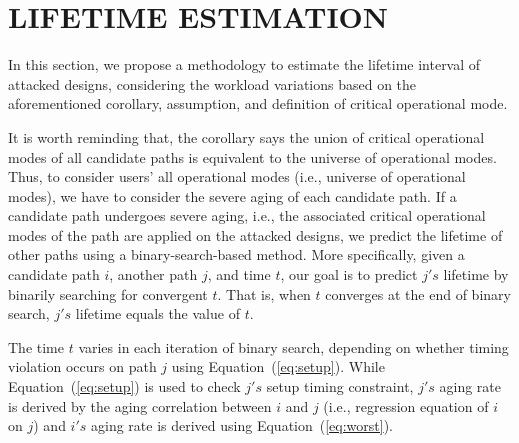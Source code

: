 
\section{LIFETIME ESTIMATION}
\label{sec:lt_estimation}
In this section, we propose a methodology to estimate the lifetime interval of attacked designs, considering the workload variations based on the aforementioned corollary, assumption, and definition of critical operational mode.

It is worth reminding that, the corollary says the union of critical operational modes of all candidate paths is equivalent to the universe of operational modes. Thus, to consider users' all operational modes (i.e., universe of operational modes), we have to consider the severe aging of each candidate path. If a candidate path undergoes severe aging, i.e., the associated critical operational modes of the path are applied on the attacked designs, we predict the lifetime of other paths using a binary-search-based method. More specifically, given a candidate path $i$, another path $j$, and time $t$, our goal is to predict $j's$ lifetime by binarily searching for convergent $t$. That is, when $t$ converges at the end of binary search, $j's$ lifetime equals the value of $t$. 

The time $t$ varies in each iteration of binary search, depending on whether timing violation occurs on path $j$ using Equation~(\ref{eq:setup}). While Equation~(\ref{eq:setup}) is used to check $j's$ setup timing constraint, $j's$ aging rate is derived by the aging correlation between $i$ and $j$ (i.e., regression equation of $i$ on $j$) and $i's$ aging rate is derived using Equation~(\ref{eq:worst}).

  
